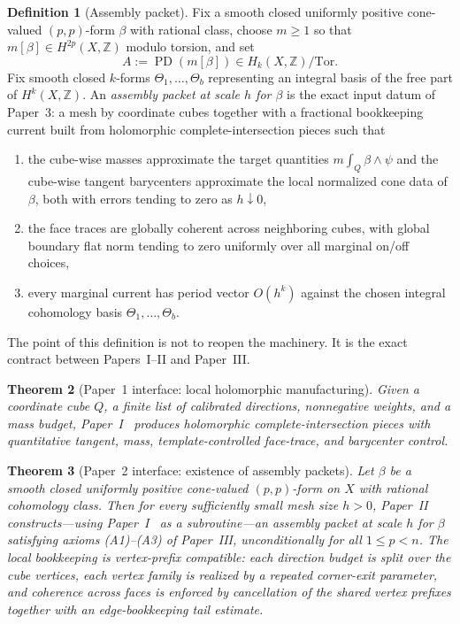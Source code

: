 \documentclass[11pt]{article}
\numberwithin{equation}{section}
\theoremstyle{plain}
\newtheorem{theorem}{Theorem}[section]
\theoremstyle{definition}
\newtheorem{definition}[theorem]{Definition}
\theoremstyle{remark}
\DeclareMathOperator{\PD}{PD}
\newcommand{\Z}{\mathbb{Z}}
\newcommand{\Tor}{\mathrm{Tor}}
\begin{document}
\begin{definition}[Assembly packet]
Fix a smooth closed uniformly positive cone-valued $(p,p)$-form $\beta$ with rational class, choose $m\ge 1$ so that $m[\beta]\in H^{2p}(X,\Z)$ modulo torsion, and set
\[
A:=\PD(m[\beta])\in H_k(X,\Z)/\Tor.
\]
Fix smooth closed $k$-forms $\Theta_1,\dots,\Theta_b$ representing an integral basis of the free part of $H^k(X,\Z)$.
An \emph{assembly packet at scale $h$ for $\beta$} is the exact input datum of Paper~3: a mesh by coordinate cubes together with a fractional bookkeeping current built from holomorphic complete-intersection pieces such that
\begin{enumerate}
\item[\textnormal{(A1)}] the cube-wise masses approximate the target quantities $m\int_Q \beta\wedge\psi$ and the cube-wise tangent barycenters approximate the local normalized cone data of $\beta$, both with errors tending to zero as $h\downarrow 0$,
\item[\textnormal{(A2)}] the face traces are globally coherent across neighboring cubes, with global boundary flat norm tending to zero uniformly over all marginal on/off choices,
\item[\textnormal{(A3)}] every marginal current has period vector $O(h^k)$ against the chosen integral cohomology basis $\Theta_1,\dots,\Theta_b$.
\end{enumerate}
\end{definition}

The point of this definition is not to reopen the machinery.  It is the exact contract between Papers~I--II and Paper~III.

\begin{theorem}[Paper~1 interface: local holomorphic manufacturing]\label{thm:paper1}
Given a coordinate cube $Q$, a finite list of calibrated directions, nonnegative weights, and a mass budget, Paper~I~\cite[Thm.~1.1]{Washburn26I} produces holomorphic complete-intersection pieces with quantitative tangent, mass, template-controlled face-trace, and barycenter control.
\end{theorem}

\begin{theorem}[Paper~2 interface: existence of assembly packets]\label{thm:paper2}
Let $\beta$ be a smooth closed uniformly positive cone-valued $(p,p)$-form on $X$ with rational cohomology class. Then for every sufficiently small mesh size $h>0$, Paper~II~\cite[Thm.~1.1]{Washburn26II} constructs---using Paper~I~\cite[Thm.~1.1]{Washburn26I} as a subroutine---an assembly packet at scale $h$ for $\beta$ satisfying axioms \textnormal{(A1)--(A3)} of Paper~III, unconditionally for all $1\le p<n$.  The local bookkeeping is vertex-prefix compatible: each direction budget is split over the cube vertices, each vertex family is realized by a repeated corner-exit parameter, and coherence across faces is enforced by cancellation of the shared vertex prefixes together with an edge-bookkeeping tail estimate.
\end{theorem}
\end{document}
